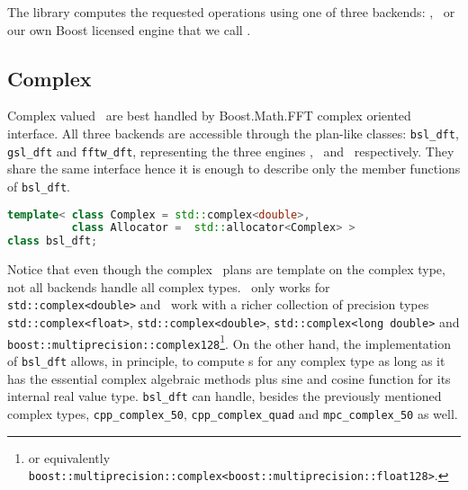 The library computes the requested operations using one of three backends:
\gsl, \fftw\ or our own Boost licensed engine that we call \bsl. 

\subsection{Complex \dft}
Complex valued \dft\ are best handled by Boost.Math.FFT complex oriented
interface. All three backends are accessible through the plan-like classes:
\verb|bsl_dft|, \verb|gsl_dft| and \verb|fftw_dft|, representing the three
engines \bsl, \gsl\ and \fftw\ respectively. They share the same interface hence
it is enough to describe only the member functions of \verb|bsl_dft|.
\begin{lstlisting}[language=C++,caption=Complex plan declaration.]
template< class Complex = std::complex<double>, 
          class Allocator =  std::allocator<Complex> >
class bsl_dft;
\end{lstlisting}

Notice that even though the complex \dft\ plans are template on the complex
type, not all backends handle all complex types. \gsl\ only works for
\verb|std::complex<double>| and \fftw\ work with a richer collection of
precision types
\verb|std::complex<float>|, \verb|std::complex<double>|, 
\verb|std::complex<long double>| and
\verb|boost::multiprecision::complex128|\footnote{or equivalently
\texttt{boost::multiprecision::complex<boost::multiprecision::float128>}.}.
On the other hand, the implementation of \verb|bsl_dft| allows, in principle, to
compute \dft s
for any complex type as long as it has the essential complex
algebraic methods plus sine and cosine function for its internal real value type.
\verb|bsl_dft| can handle, besides the previously mentioned complex types,
\verb|cpp_complex_50|, 
\verb|cpp_complex_quad| and 
\verb|mpc_complex_50| as well.


